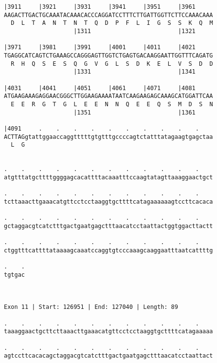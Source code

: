 \documentclass{article}
\begin{document}
\begin{Verbatim}
|3911     |3921     |3931     |3941     |3951     |3961     
AAGACTTGACTGCAAATACAAACACCCAGGATCCTTTCTTGATTGGTTCTTCCAAACAAA
  D  L  T  A  N  T  N  T  Q  D  P  F  L  I  G  S  S  K  Q  M
                    |1311                         |1321     
  
|3971     |3981     |3991     |4001     |4011     |4021     
TGAGGCATCAGTCTGAAAGCCAGGGAGTTGGTCTGAGTGACAAGGAATTGGTTTCAGATG
  R  H  Q  S  E  S  Q  G  V  G  L  S  D  K  E  L  V  S  D  D
                    |1331                         |1341     
  
|4031     |4041     |4051     |4061     |4071     |4081     
ATGAAGAAAGAGGAACGGGCTTGGAAGAAAATAATCAAGAAGAGCAAAGCATGGATTCAA
  E  E  R  G  T  G  L  E  E  N  N  Q  E  E  Q  S  M  D  S  N
                    |1351                         |1361     
  
|4091     .    .    .    .    .    .    .    .    .    .    
ACTTAGgtattggaaccaggtttttgtgtttgccccagtctatttatagaagtgagctaa
  L  G                                                      
                                                            
  
.    .    .    .    .    .    .    .    .    .    .    .    
atgtttatgcttttggggagcacattttacaaatttccaagtatagttaaaggaactgct
                                                            
.    .    .    .    .    .    .    .    .    .    .    .    
tcttaaacttgaaacatgttcctcctaaggtgcttttcatagaaaaaagtccttcacaca
                                                            
.    .    .    .    .    .    .    .    .    .    .    .    
gctaggacgtcatctttgactgaatgagctttaacatcctaattactggtggacttactt
                                                            
.    .    .    .    .    .    .    .    .    .    .    .    
ctggtttcattttataaaagcaaatccaggtgtcccaaagcaaggaatttaatcattttg
                                                            
.    .
tgtgac
      
      
 
Exon 11 | Start: 126951 | End: 127040 | Length: 89
 
.    .    .    .    .    .    .    .    .    .    .    .    
taaaggaactgcttcttaaacttgaaacatgttcctcctaaggtgcttttcatagaaaaa
                                                            
.    .    .    .    .    .    .    .    .    .    .    .    
agtccttcacacagctaggacgtcatctttgactgaatgagctttaacatcctaattact
                                                            

\end{Verbatim}
\end{document}
